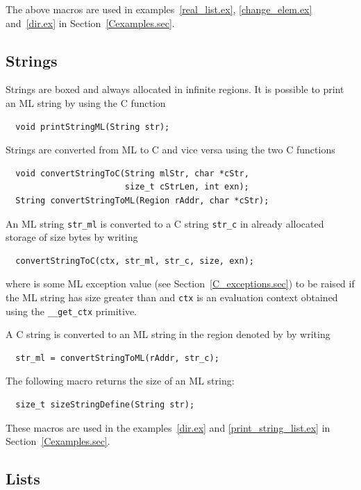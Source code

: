 \documentclass[12pt]{book}
\begin{document}
The above macros are used in examples~\ref{real_list.ex},
\ref{change_elem.ex} and~\ref{dir.ex} in Section~\ref{Cexamples.sec}.

\subsection{Strings}
Strings are boxed and always allocated in infinite regions. It is possible
to print an ML string by using the C function
%
\begin{verbatim}
  void printStringML(String str);
\end{verbatim}

Strings are converted from ML to C and vice versa using the two C
functions
%
%
\begin{verbatim}
  void convertStringToC(String mlStr, char *cStr,
                        size_t cStrLen, int exn);
  String convertStringToML(Region rAddr, char *cStr);
\end{verbatim}
An ML string \verb|str_ml| is converted to a C
string \verb|str_c| in already allocated storage of size  bytes by writing
\begin{verbatim}
  convertStringToC(ctx, str_ml, str_c, size, exn);
\end{verbatim}
where  is some ML exception value (see
Section~\ref{C_exceptions.sec}) to be raised if the ML string has size
greater than  and \texttt{ctx} is an evaluation context
obtained using the \verb|__get_ctx| primitive.

A C string is converted to an ML string in the region denoted by
 by writing
\begin{verbatim}
  str_ml = convertStringToML(rAddr, str_c);
\end{verbatim}

The following macro returns the size of an ML string:
%
\begin{verbatim}
  size_t sizeStringDefine(String str);
\end{verbatim}

These macros are used in the examples~\ref{dir.ex} and
\ref{print_string_list.ex} in Section~\ref{Cexamples.sec}.

\subsection{Lists}
\end{document}
